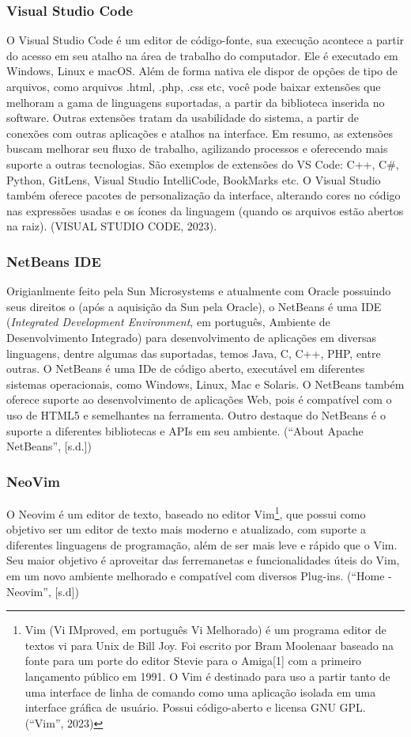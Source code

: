 \documentclass[a4paper,12pt]{article}
\begin{document}
\subsubsection{Visual Studio Code}
O Visual Studio Code é um editor de código-fonte, sua execução acontece a partir do acesso em seu atalho na área de trabalho do computador. 
Ele é executado em Windows, Linux e macOS. Além de forma nativa ele dispor de opções de tipo de arquivos, como arquivos .html, .php, .css etc, 
você pode baixar extensões que melhoram a gama de linguagens suportadas, a partir da biblioteca inserida no software. Outras extensões tratam da 
usabilidade do sistema, a partir de conexões com outras aplicações e atalhos na interface. Em resumo, as extensões buscam melhorar seu fluxo de 
trabalho, agilizando processos e oferecendo mais suporte a outras tecnologias. São exemplos de extensões do VS Code: C++, C\#, Python, GitLens, 
Visual Studio IntelliCode, BookMarks etc. O Visual Studio também oferece pacotes de personalização da interface, alterando cores no código nas 
expressões usadas e os ícones da linguagem (quando os arquivos estão abertos na raiz). (VISUAL STUDIO CODE, 2023).

\subsubsection{NetBeans IDE}
Origianlmente feito pela Sun Microsystems e atualmente com Oracle possuindo seus direitos o (após a aquisição da Sun pela Oracle), o NetBeans é uma 
IDE (\textit{Integrated Development Environment}, em português, Ambiente de Desenvolvimento Integrado) para desenvolvimento de aplicações em 
diversas linguagens, dentre algumas das suportadas, temos Java, C, C++, PHP, entre outras. O NetBeans é uma IDe de código aberto, executável 
em diferentes sistemas operacionais, como Windows, Linux, Mac e Solaris. O NetBeans também oferece suporte ao desenvolvimento de aplicações Web, 
pois é compatível com o uso de HTML5 e semelhantes na ferramenta. Outro destaque do NetBeans é o suporte a diferentes bibliotecas e APIs 
em seu ambiente. (“About Apache NetBeans”, [s.d.])

\subsubsection{NeoVim}
O Neovim é um editor de texto, baseado no editor Vim\footnote{
	Vim (Vi IMproved, em português Vi Melhorado) é um programa editor de textos vi para Unix de Bill Joy. Foi escrito por Bram Moolenaar baseado na fonte para um porte do editor 
	Stevie para o Amiga[1] com a primeiro lançamento público em 1991. O Vim é destinado para uso a partir tanto de uma interface de linha de comando como uma aplicação isolada em uma interface gráfica de usuário.
	Possui código-aberto e licensa GNU GPL. (“Vim”, 2023)
}, que possui como objetivo ser um editor de texto mais moderno e atualizado, com suporte a diferentes linguagens de programação, além de ser mais leve e rápido que o Vim.
Seu maior objetivo é aproveitar das ferremanetas e funcionalidades úteis do Vim, em um novo ambiente melhorado e 
compatível com diversos Plug-ins. (“Home - Neovim”, [s.d])
\end{document}
